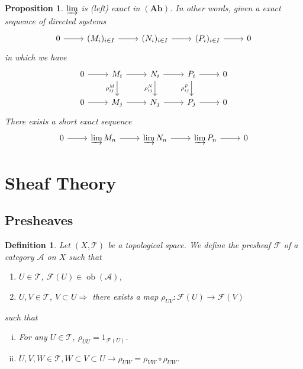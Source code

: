 \documentclass{article}
\newtheorem{proposition}{Proposition}[section]
\newtheorem{definition}{Definition}[section]
\numberwithin{equation}{section}
\DeclareMathOperator{\ob}{ob}
\begin{document}
\begin{proposition}
$\varinjlim$ is (left) exact in $(\mathbf{Ab})$. In other words, 
given a exact sequence of directed systems 
\[
\begin{tikzcd}
0 \arrow[r] & (M_i)_{i\in I} \arrow[r] & (N_i)_{i\in I} \arrow[r] & (P_i)_{i\in I} \arrow[r] & 0
\end{tikzcd}
\]
in which we have
\[
\begin{tikzcd}
0 \arrow[r] & M_i \arrow[r] \arrow[d, "\rho^M_{ij}"'] & N_i \arrow[r] \arrow[d, "\rho^N_{ij}"'] & P_i \arrow[r] \arrow[d, "\rho^P_{ij}"'] & 0 \\
0 \arrow[r] & M_j \arrow[r]                           & N_j \arrow[r]                           & P_j \arrow[r]                           & 0
\end{tikzcd}
\]
There exists a short exact sequence 
\[
\begin{tikzcd}
0 \arrow[r] & \varinjlim M_n \arrow[r] & \varinjlim N_n \arrow[r] & \varinjlim P_n \arrow[r] & 0
\end{tikzcd}
\]
\end{proposition}

\section{Sheaf Theory}

\subsection{Presheaves}

\begin{definition}
Let $(X,\mathcal{T})$ be a topological space. We define the presheaf $\mathcal{F}$ of a category $\mathcal{A}$ on $X$ such that 
\begin{enumerate}[\textbullet]
\item $U\in\mathcal{T}$, $\mathcal{F}(U)\in\ob(\mathcal{A})$,
\item $U,V\in\mathcal{T}$, $V\subset U \Rightarrow $ there exists a map $\rho_{UV}:\mathcal{F}(U)\to\mathcal{F}(V)$ 
\end{enumerate}

such that 
\begin{enumerate}[i).]
\item For any $U\in\mathcal{T}$, $\rho_{UU}=1_{\mathcal{F}(U)}$.
\item $U,V,W\in\mathcal{T}, W\subset V\subset U\rightarrow \rho_{UW}=\rho_{VW}\circ\rho_{UW}$.
\end{enumerate}
\end{definition}
\end{document}
